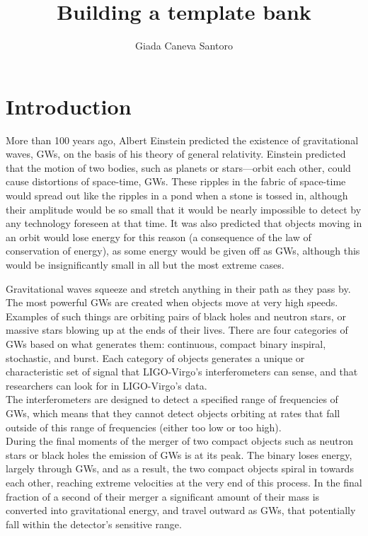 \documentclass[binding=0.6cm, LaM]{sapthesis}
\title{Building a template bank}
\author{Giada Caneva Santoro}
\begin{document}
\frontmatter
\maketitle
\dedication{Fortsett å gå.}


\tableofcontents

\mainmatter 

\chapter{Introduction}

	More than 100 years ago, Albert Einstein predicted the existence of gravitational waves,
	GWs, on the basis of his theory of general relativity.  
	Einstein predicted that the motion of two bodies, such as planets or stars—orbit each other,
	could cause distortions of space-time, GWs.
	These ripples in the fabric of space-time would spread out like the ripples in a pond when a stone is tossed in,
	although their amplitude would be so small that it would be nearly impossible to detect by any technology foreseen at that time.
	It was also predicted that objects moving in an orbit would lose energy for this reason 
	(a consequence of the law of conservation of energy), as some energy would be given off as GWs, 
	although this would be insignificantly small in all but the most extreme cases. 

	Gravitational waves squeeze and stretch anything in their path as they pass by.
	The most powerful GWs are created when objects move at very high speeds. 
	Examples of such things are orbiting pairs of black holes and neutron stars, 
	or massive stars blowing up at the ends of their lives.
	There are four categories of GWs based on what generates them: 
	continuous, compact binary inspiral, stochastic, and burst. 	
	Each category of objects generates a unique or characteristic set of signal 
	that LIGO-Virgo's interferometers can sense, and that researchers can look for in LIGO-Virgo’s data. \\
        The interferometers are designed to detect a specified range of frequencies of GWs,
        which means that they cannot detect objects orbiting at rates that fall outside of this range of frequencies 
        (either too low or too high). \\ 
	During the final moments of the merger of two compact objects such as neutron stars 
	or black holes the emission of GWs is at its peak. The binary loses energy, 
	largely through GWs, and as a result, the two compact objects spiral in towards each other, 
	reaching extreme velocities at the very end of this process. 
	In the final fraction of a second of their merger a significant amount of their mass is converted into gravitational energy, 
	and travel outward as GWs, that potentially fall within the detector’s sensitive range. 
 
\end{document}

